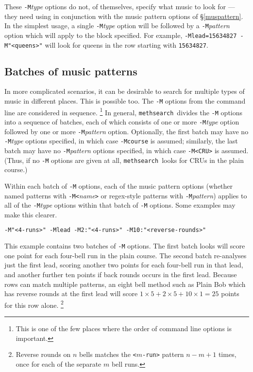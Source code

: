 \documentclass[a4paper,11pt,oneside]{book}
\def\methsearch{\texttt{meth\-search}}
\newcommand{\sref}[1]{\hyperref[#1]{\S\ref{#1}}}
\begin{document}
These \verb+-M+\textit{type} options do not, of themselves, specify what
music to look for --- they need using in conjunction with the 
music pattern options of \sref{muspattern}.  In the simplest usage, a single
\verb+-M+\textit{type} option will be followed by a \verb+-M+\textit{pattern}
option which will apply to the block specified.  For example,
\texttt{-Mlead=15634827 -M"<queens>"} will look for queens in the row 
starting with \verb+15634827+.

\subsection{Batches of music patterns}

In more complicated scenarios, it can be desirable to search for 
multiple types of music in different places.  This is possible too.
The \verb+-M+ options from the command line are considered in sequence.%
\footnote{This is one of the few places where the order of command line 
options is important.}
In general, \methsearch\ divides the \verb+-M+ options into a sequence of 
batches, each of which consists of one or more \verb+-M+\textit{type} option 
followed by one or more \verb+-M+\textit{pattern} option.  
Optionally, the first batch may have no \verb+-M+\textit{type} options 
specified, in which case \verb+-Mcourse+ is assumed;
similarly, the last batch may have no \verb+-M+\textit{pattern} options
specified, in which case \verb+-M<CRU>+ is assumed.  (Thus, if no \verb+-M+
options are given at all, \methsearch\ looks for CRUs in the plain course.)

Within each batch of \verb+-M+ options, each of the music pattern options
(whether named patterns with \verb+-M<+\textit{name}\verb+>+ or 
regex-style patterns with \verb+-M+\textit{pattern}) 
applies to all of the \verb+-M+\textit{type} options within that 
batch of \verb+-M+ options.  Some examples may make this clearer.

\begin{Verbatim}
-M"<4-runs>" -Mlead -M2:"<4-runs>" -M10:"<reverse-rounds>"
\end{Verbatim}
This example contains two batches of \verb+-M+ options.  The first batch
looks will score one point for each four-bell run in the plain course.
The second batch re-analyses just the first lead, scoring another two points 
for each four-bell run in that lead, and another further ten points if back 
rounds occurs in the first lead.  
Because rows can match multiple patterns, an eight bell method such as
Plain Bob which has reverse rounds at the first lead will score 
$\textrm{1}\times\textrm{5} + \textrm{2}\times\textrm{5} 
  + \textrm{10}\times\textrm{1} = \textrm{25}$ points for this row alone.%
\footnote{Reverse rounds on $n$ bells matches the \texttt{<$m$-run>} pattern 
$n-m+1$ times, once for each of the separate $m$ bell runs.}
\end{document}
